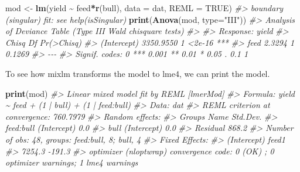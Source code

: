 \documentclass[
]{article}
\newenvironment{Shaded}{\begin{snugshade}}{\end{snugshade}}
\newcommand{\AttributeTok}[1]{\textcolor[rgb]{0.13,0.29,0.53}{#1}}
\newcommand{\CommentTok}[1]{\textcolor[rgb]{0.56,0.35,0.01}{\textit{#1}}}
\newcommand{\ConstantTok}[1]{\textcolor[rgb]{0.56,0.35,0.01}{#1}}
\newcommand{\FunctionTok}[1]{\textcolor[rgb]{0.13,0.29,0.53}{\textbf{#1}}}
\newcommand{\NormalTok}[1]{#1}
\newcommand{\OtherTok}[1]{\textcolor[rgb]{0.56,0.35,0.01}{#1}}
\newcommand{\SpecialCharTok}[1]{\textcolor[rgb]{0.81,0.36,0.00}{\textbf{#1}}}
\newcommand{\StringTok}[1]{\textcolor[rgb]{0.31,0.60,0.02}{#1}}
\begin{document}
\begin{Shaded}
\begin{Highlighting}[]
\NormalTok{mod }\OtherTok{\textless{}{-}} \FunctionTok{lm}\NormalTok{(yield }\SpecialCharTok{\textasciitilde{}}\NormalTok{ feed}\SpecialCharTok{*}\FunctionTok{r}\NormalTok{(bull), }\AttributeTok{data =}\NormalTok{ dat, }\AttributeTok{REML =} \ConstantTok{TRUE}\NormalTok{)}
\CommentTok{\#\textgreater{} boundary (singular) fit: see help(\textquotesingle{}isSingular\textquotesingle{})}
\FunctionTok{print}\NormalTok{(}\FunctionTok{Anova}\NormalTok{(mod, }\AttributeTok{type=}\StringTok{"III"}\NormalTok{))}
\CommentTok{\#\textgreater{} Analysis of Deviance Table (Type III Wald chisquare tests)}
\CommentTok{\#\textgreater{} }
\CommentTok{\#\textgreater{} Response: yield}
\CommentTok{\#\textgreater{}                 Chisq Df Pr(\textgreater{}Chisq)    }
\CommentTok{\#\textgreater{} (Intercept) 3350.9550  1     \textless{}2e{-}16 ***}
\CommentTok{\#\textgreater{} feed           2.3294  1     0.1269    }
\CommentTok{\#\textgreater{} {-}{-}{-}}
\CommentTok{\#\textgreater{} Signif. codes:  0 \textquotesingle{}***\textquotesingle{} 0.001 \textquotesingle{}**\textquotesingle{} 0.01 \textquotesingle{}*\textquotesingle{} 0.05 \textquotesingle{}.\textquotesingle{} 0.1 \textquotesingle{} \textquotesingle{} 1}
\end{Highlighting}
\end{Shaded}

To see how mixlm transforms the model to lme4, we can print the model.

\begin{Shaded}
\begin{Highlighting}[]
\FunctionTok{print}\NormalTok{(mod)}
\CommentTok{\#\textgreater{} Linear mixed model fit by REML [\textquotesingle{}lmerMod\textquotesingle{}]}
\CommentTok{\#\textgreater{} Formula: yield \textasciitilde{} feed + (1 | bull) + (1 | feed:bull)}
\CommentTok{\#\textgreater{}    Data: dat}
\CommentTok{\#\textgreater{} REML criterion at convergence: 760.7979}
\CommentTok{\#\textgreater{} Random effects:}
\CommentTok{\#\textgreater{}  Groups    Name        Std.Dev.}
\CommentTok{\#\textgreater{}  feed:bull (Intercept)   0.0   }
\CommentTok{\#\textgreater{}  bull      (Intercept)   0.0   }
\CommentTok{\#\textgreater{}  Residual              868.2   }
\CommentTok{\#\textgreater{} Number of obs: 48, groups:  feed:bull, 8; bull, 4}
\CommentTok{\#\textgreater{} Fixed Effects:}
\CommentTok{\#\textgreater{} (Intercept)        feed1  }
\CommentTok{\#\textgreater{}      7254.3       {-}191.3  }
\CommentTok{\#\textgreater{} optimizer (nloptwrap) convergence code: 0 (OK) ; 0 optimizer warnings; 1 lme4 warnings}
\end{Highlighting}
\end{Shaded}
\end{document}
